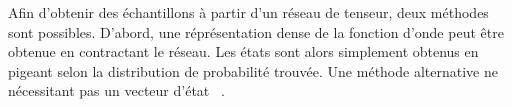 Afin d'obtenir des échantillons à partir d'un réseau de tenseur, deux méthodes sont possibles. D'abord, une réprésentation dense de la fonction d'onde peut être obtenue en contractant le réseau. Les états sont alors simplement obtenus en pigeant selon la distribution de probabilité trouvée. Une méthode alternative ne nécessitant pas un vecteur d'état ~\cite{ferrisPerfectSamplingUnitary2012}. 

